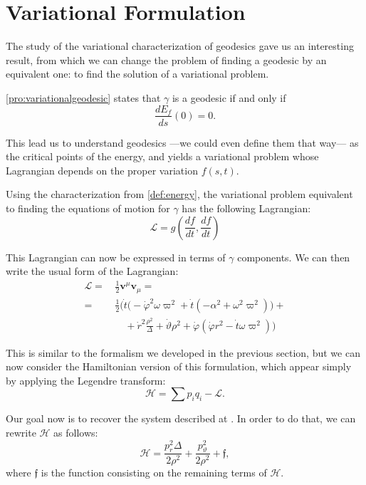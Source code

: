 	
\section{Variational Formulation}
The study of the variational characterization of geodesics gave us an interesting result, from which we can change the problem of finding a geodesic by an equivalent one: to find the solution of a variational problem.

\autoref{pro:variationalgeodesic} states that $\gamma$ is a geodesic if and only if
\[
\frac{dE_f}{ds}(0) = 0.
\]

This lead us to understand geodesics ---we could even define them that way--- as the critical points of the energy, and yields a variational problem whose Lagrangian depends on the proper variation $f(s,t)$.

Using the characterization from \autoref{def:energy}, the variational problem equivalent to finding the equations of motion for $\gamma$ has the following Lagrangian:
\begin{equation}
	\label{eq:1stlagrangian}
	\mathcal{L} = g\left( \frac{df}{dt}, \frac{df}{dt} \right)
\end{equation}

This Lagrangian can now be expressed in terms of $\gamma$ components. We can then write the usual form of the Lagrangian:
\begin{align}
\mathcal{L} =\,& \frac{1}{2} \mathbf{v}^\mu \mathbf{v}_\mu = \\
=\,& \frac{1}{2} \Biggl( \dot{t}\biggl( -\dot{\varphi}^2\omega\varpi^2 + \dot{t} \left( -\alpha^2 + \omega^2\varpi^2 \right) \biggr) +\\
&\quad + \dot{r}^2\frac{\rho^2}{\Delta} + \dot{\vartheta}\rho^2 + \dot{\varphi}\left( \dot{\varphi} r^2 - \dot{t} \omega \varpi^2 \right) \Biggr)
\end{align}

This is similar to the formalism we developed in the previous section, but we can now consider the Hamiltonian version of this formulation, which appear simply by applying the Legendre transform:
\begin{equation*}
	\mathcal{H} = \sum p_i q_i - \mathcal{L}.
\end{equation*}

Our goal now is to recover the system described at \cite[Eq. (A.15)]{thorne15}. In order to do that, we can rewrite $\mathcal{H}$ as follows:
\begin{equation}
	\label{eq:hamiltonian}
	\mathcal{H} = \frac{p_r^2 \Delta}{2\rho^2} + \frac{p_\vartheta^2}{2\rho^2} + \mathfrak{f},
\end{equation}
where $\mathfrak{f}$ is the function consisting on the remaining terms of $\mathcal{H}$.

